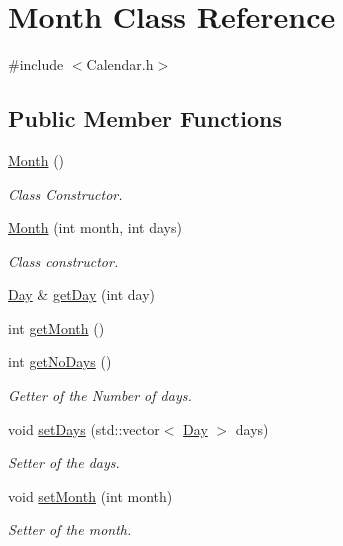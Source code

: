 \hypertarget{class_month}{}\section{Month Class Reference}
\label{class_month}


{\ttfamily \#include $<$Calendar.\+h$>$}

\subsection*{Public Member Functions}
\begin{DoxyCompactItemize}
\item 
\mbox{\label{class_month_a36882c55ece9c4210ec1b01bd665ec89}} 
\mbox{\hyperlink{class_month_a36882c55ece9c4210ec1b01bd665ec89}{Month}} ()
\begin{DoxyCompactList}\small\item\em Class Constructor. \end{DoxyCompactList}\item 
\mbox{\hyperlink{class_month_a4abb71ddcd1dfed172a828d8598bbdc7}{Month}} (int month, int days)
\begin{DoxyCompactList}\small\item\em Class constructor. \end{DoxyCompactList}\item 
\mbox{\hyperlink{class_day}{Day}} \& \mbox{\hyperlink{class_month_aea6a1844798c684548c1de899cf620b2}{get\+Day}} (int day)
\item 
int \mbox{\hyperlink{class_month_a5bc7c527734f8bc303fea424cd265357}{get\+Month}} ()
\item 
int \mbox{\hyperlink{class_month_a901b9af10fe3f3dab931927c2ab77440}{get\+No\+Days}} ()
\begin{DoxyCompactList}\small\item\em Getter of the Number of days. \end{DoxyCompactList}\item 
void \mbox{\hyperlink{class_month_a816bb5d0a2d54283ece6924a7b54df36}{set\+Days}} (std\+::vector$<$ \mbox{\hyperlink{class_day}{Day}} $>$ days)
\begin{DoxyCompactList}\small\item\em Setter of the days. \end{DoxyCompactList}\item 
void \mbox{\hyperlink{class_month_a9f6e8f474768770ae897e53177eb1797}{set\+Month}} (int month)
\begin{DoxyCompactList}\small\item\em Setter of the month. \end{DoxyCompactList}\end{DoxyCompactItemize}


